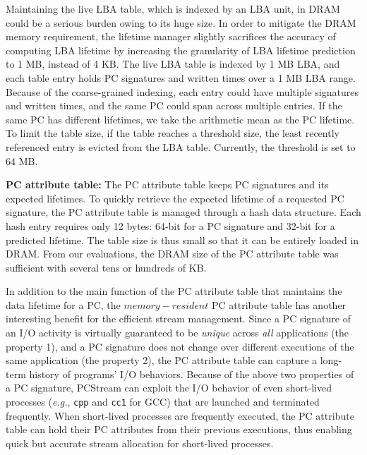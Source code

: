 Maintaining the live LBA table, which is indexed by an LBA unit, in DRAM could
be a serious burden owing to its huge size. In order to mitigate the DRAM
memory requirement, the lifetime manager slightly sacrifices the accuracy of
computing LBA lifetime by increasing the granularity of LBA lifetime prediction
to 1 MB, instead of 4 KB.  The live LBA table is indexed by 1 MB LBA, and each
table entry holds PC signatures and written times over a 1 MB LBA range.
Because of the coarse-grained indexing, each entry could have multiple
signatures and written times, and the same PC could span across multiple
entries.  If the same PC has different lifetimes, we take the arithmetic mean
as the PC lifetime.  To limit the table size, if the table reaches a threshold
size, the least recently referenced entry is evicted from the LBA table.
Currently, the threshold is set to 64 MB.

\textbf{PC attribute table:}
The PC attribute table keeps PC signatures and its expected lifetimes. To
quickly retrieve the expected lifetime of a requested PC signature, the PC
attribute table is managed through a hash data structure. Each hash entry
requires only 12 bytes: 64-bit for a PC signature and 32-bit for a predicted
lifetime.  The table size is thus small so that it can be entirely loaded
in DRAM.  From our evaluations, the DRAM size of the PC attribute table was
sufficient with several tens or hundreds of KB.

In addition to the main function of the PC attribute table that maintains the
data lifetime for a PC, the $memory-resident$ PC attribute table has another
interesting benefit for the efficient stream management.  Since a PC
signature of an I/O activity is virtually guaranteed to be {\it unique} across
{\it all} applications (the property 1),  and a PC signature does not change
over different executions of the same application (the property 2), the PC
attribute table can capture a long-term history of programs' I/O behaviors.
Because of the above two properties of a PC signature, \textsf{\small PCStream}
can exploit the I/O behavior of even short-lived processes ({\it e.g.}, \texttt{cpp}
and \texttt{cc1} for GCC)  that are launched and terminated frequently.  When
short-lived processes are frequently executed, the PC attribute table can hold
their PC attributes from their previous executions, thus enabling quick but
accurate stream allocation for short-lived processes.


